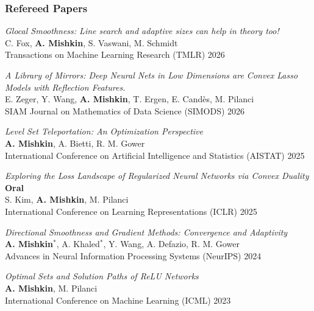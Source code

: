 \subsubsection{Refereed Papers}
\begin{description}[leftmargin=\mleftsize,style=nextline,font=\normalfont\space]
    \textit{Glocal Smoothness: Line search and adaptive sizes can help in theory too!}\\
    C. Fox, \textbf{A. Mishkin}, S. Vaswani, M. Schmidt\\
    Transactions on Machine Learning Research (TMLR) 2026

    \textit{A Library of Mirrors: Deep Neural Nets in Low Dimensions are Convex
        Lasso Models with Reflection Features.}\\
    E. Zeger, Y. Wang, \textbf{A. Mishkin}, T. Ergen, E. Candès, M.  Pilanci\\
    SIAM Journal on Mathematics of Data Science (SIMODS) 2026

    \textit{Level Set Teleportation: An Optimization Perspective}\\
    {\bf A. Mishkin}, A. Bietti, R. M. Gower\\
    International Conference on Artificial Intelligence and Statistics (AISTAT) 2025
    \hfill 

    \textit{Exploring the Loss Landscape of Regularized Neural Networks via Convex Duality}
    \hfill {\bf Oral}
    \\
    S. Kim, {\bf A. Mishkin}, M. Pilanci\\
    International Conference on Learning Representations (ICLR) 2025

    \textit{Directional Smoothness and Gradient Methods: Convergence and Adaptivity}\\
    {\bf A. Mishkin}$^*$, A. Khaled$^*$, Y. Wang, A. Defazio, R. M. Gower\\
    Advances in Neural Information Processing Systems (NeurIPS) 2024

    \textit{Optimal Sets and Solution Paths of ReLU Networks}\\
    {\bf A. Mishkin}, M. Pilanci\\
    International Conference on Machine Learning (ICML) 2023


\end{description}
